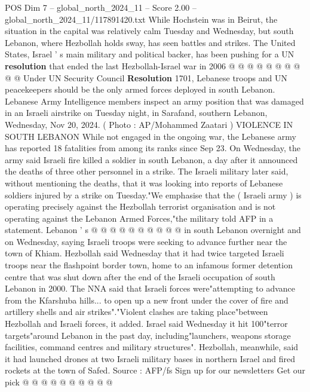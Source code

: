 \begin{textsample}{POS Dim 7 – global\_north\_2024\_11 – Score 2.00 – global\_north\_2024\_11/117891420.txt}
While Hochstein was in Beirut, the situation in the capital was relatively calm Tuesday and Wednesday, but south Lebanon, where Hezbollah holds sway, has seen battles and strikes.
The United States, Israel ' s main military and political backer, has been pushing for a UN \textbf{resolution} that ended the last Hezbollah-Israel war in 2006 @ @ @ @ @ @ @ @ @ @ Under UN Security Council \textbf{Resolution} 1701, Lebanese troops and UN peacekeepers should be the only armed forces deployed in south Lebanon.
Lebanese Army Intelligence members inspect an army position that was damaged in an Israeli airstrike on Tuesday night, in Sarafand, southern Lebanon, Wednesday, Nov 20, 2024. ( Photo : AP/Mohammed Zaatari ) VIOLENCE IN SOUTH LEBANON While not engaged in the ongoing war, the Lebanese army has reported 18 fatalities from among its ranks since Sep 23.
On Wednesday, the army said Israeli fire killed a soldier in south Lebanon, a day after it announced the deaths of three other personnel in a strike.
The Israeli military later said, without mentioning the deaths, that it was looking into reports of Lebanese soldiers injured by a strike on Tuesday."We emphasise that the ( Israeli army ) is operating precisely against the Hezbollah terrorist organisation and is not operating against the Lebanon Armed Forces,"the military told AFP in a statement.
Lebanon ' s @ @ @ @ @ @ @ @ @ @ in south Lebanon overnight and on Wednesday, saying Israeli troops were seeking to advance further near the town of Khiam.
Hezbollah said Wednesday that it had twice targeted Israeli troops near the flashpoint border town, home to an infamous former detention centre that was shut down after the end of the Israeli occupation of south Lebanon in 2000.
The NNA said that Israeli forces were"attempting to advance from the Kfarshuba hills... to open up a new front under the cover of fire and artillery shells and air strikes"."Violent clashes are taking place"between Hezbollah and Israeli forces, it added.
Israel said Wednesday it hit 100"terror targets"around Lebanon in the past day, including"launchers, weapons storage facilities, command centres and military structures".
Hezbollah, meanwhile, said it had launched drones at two Israeli military bases in northern Israel and fired rockets at the town of Safed.
Source : AFP/fs Sign up for our newsletters Get our pick @ @ @ @ @ @ @ @ @ @

\end{textsample}
